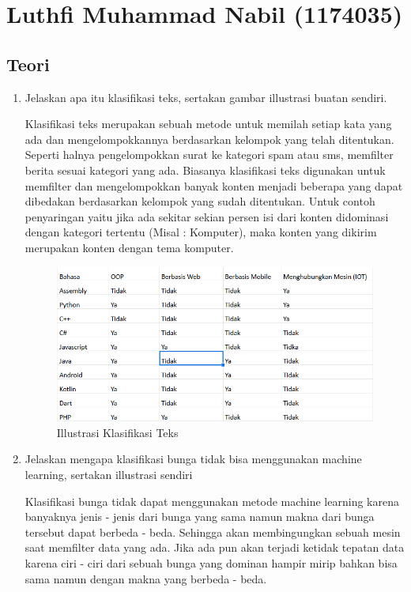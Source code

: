 \section{Luthfi Muhammad Nabil (1174035)}

\subsection{Teori}
\begin{enumerate}
    \item Jelaskan apa itu klasifikasi teks, sertakan gambar illustrasi buatan sendiri. \par
    Klasifikasi teks merupakan sebuah metode untuk memilah setiap kata yang ada dan mengelompokkannya berdasarkan kelompok yang telah ditentukan. Seperti halnya pengelompokkan surat ke kategori spam atau sms, memfilter berita sesuai kategori yang ada. Biasanya klasifikasi teks digunakan untuk memfilter dan mengelompokkan banyak konten menjadi beberapa yang dapat dibedakan berdasarkan kelompok yang sudah ditentukan. Untuk contoh penyaringan yaitu jika ada sekitar sekian persen isi dari konten didominasi dengan kategori tertentu (Misal : Komputer), maka konten yang dikirim merupakan konten dengan tema komputer.
    \begin{figure}[ht]
        \centering
        \includegraphics[scale=0.2]{figures/1174035/chapter4/1_teori.png}
        \caption{Illustrasi Klasifikasi Teks}
        \label{contoh1}
    \end{figure}
    \item Jelaskan mengapa klasifikasi bunga tidak bisa menggunakan machine learning, sertakan illustrasi sendiri \par 
    Klasifikasi bunga tidak dapat menggunakan metode machine learning karena banyaknya jenis - jenis dari bunga yang sama namun makna dari bunga tersebut dapat berbeda - beda. Sehingga akan membingungkan sebuah mesin saat memfilter data yang ada. Jika ada pun akan terjadi ketidak tepatan data karena ciri - ciri dari sebuah bunga yang dominan hampir mirip bahkan bisa sama namun dengan makna yang berbeda - beda. 

\end{enumerate}
